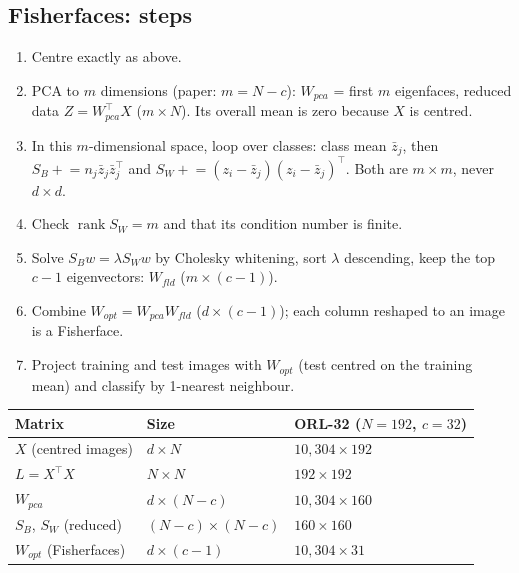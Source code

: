 \documentclass[11pt]{article}
\newcommand{\T}{^{\top}}
\begin{document}
\subsection*{Fisherfaces: steps}
\begin{enumerate}
\item Centre exactly as above.
\item PCA to $m$ dimensions (paper: $m=N-c$): $W_{pca}$ = first $m$ eigenfaces, reduced data $Z=W_{pca}\T X$ ($m\times N$). Its overall mean is zero because $X$ is centred.
\item In this $m$-dimensional space, loop over classes: class mean $\bar z_j$, then $S_B \mathrel{+}= n_j\bar z_j\bar z_j\T$ and $S_W\mathrel{+}=(z_i-\bar z_j)(z_i-\bar z_j)\T$. Both are $m\times m$, never $d\times d$.
\item Check $\operatorname{rank}S_W=m$ and that its condition number is finite.
\item Solve $S_Bw=\lambda S_Ww$ by Cholesky whitening, sort $\lambda$ descending, keep the top $c-1$ eigenvectors: $W_{fld}$ ($m\times(c-1)$).
\item Combine $W_{opt}=W_{pca}W_{fld}$ ($d\times(c-1)$); each column reshaped to an image is a Fisherface.
\item Project training and test images with $W_{opt}$ (test centred on the training mean) and classify by 1-nearest neighbour.
\end{enumerate}
\begin{center}
\begin{tabular}{lll}\toprule
Matrix & Size & ORL-32 ($N=192$, $c=32$)\\\midrule
$X$ (centred images) & $d\times N$ & $10{,}304\times192$\\
$L=X\T X$ & $N\times N$ & $192\times192$\\
$W_{pca}$ & $d\times(N-c)$ & $10{,}304\times160$\\
$S_B$, $S_W$ (reduced) & $(N-c)\times(N-c)$ & $160\times160$\\
$W_{opt}$ (Fisherfaces) & $d\times(c-1)$ & $10{,}304\times31$\\\bottomrule
\end{tabular}
\end{center}
\end{document}
